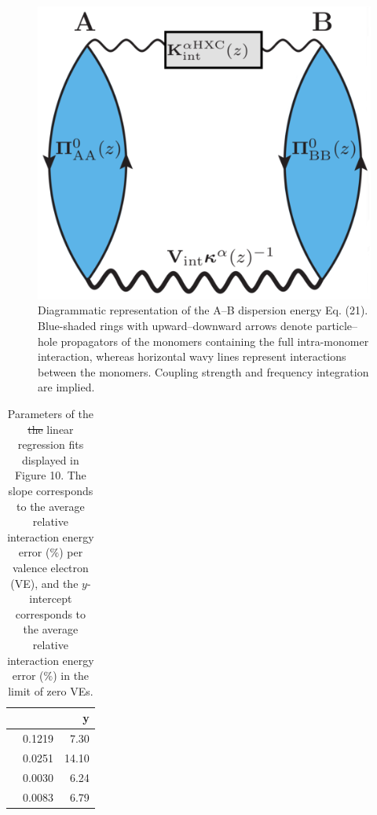 \documentclass[journal=jctcce,manuscript=article]{achemso}
\newcommand*{\rev}[1]{{\color{blue} #1}}
\begin{document}
\begin{figure}[hbtp]
  \centering
  \includegraphics[width=0.5\linewidth]{int_gold.eps}
  \caption{Diagrammatic representation of the A--B dispersion energy
    Eq. (21). \rev{Blue-shaded} rings with upward--downward
    arrows denote particle--hole propagators of the monomers containing
    the full intra-monomer interaction, whereas horizontal \rev{wavy} lines
    represent interactions between the monomers. Coupling strength and
    frequency integration \rev{are} implied.}
  \label{fig:goldstone}
\end{figure}

\begin{table}[H]
  \caption{Parameters of the \rev{\sout{the}} linear regression
    fits displayed in Figure \rev{10}. The slope corresponds to the 
    average relative interaction energy error \rev{($\%$)} per valence
    electron (VE), and the $y$-intercept corresponds to the average
    relative interaction energy error \rev{($\%$)} in the limit of zero VEs.} 
  \begin{tabular}{lRR}
    \hline
     &  & y \\
    \hline
     & 0.1219 & 7.30 \\
     & 0.0251 & 14.10 \\
    & 0.0030 & 6.24 \\
      & 0.0083 & 6.79 \\
    \hline
  \end{tabular}
  \label{tab:slopes}
\end{table}
\end{document}
